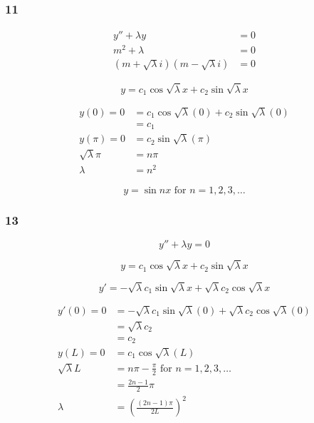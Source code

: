 \documentclass{article}
\begin{document}
\subsubsection{11}

\begin{align*}
  y'' + \lambda y                               & = 0 \\
  m^2 + \lambda                                 & = 0 \\
  (m + \sqrt{\lambda} i) (m - \sqrt{\lambda} i) & = 0
\end{align*}

\[y = c_1 \cos \sqrt{\lambda} x + c_2 \sin \sqrt{\lambda} x\]

\begin{align*}
  y(0) = 0           & = c_1 \cos \sqrt \lambda (0) + c_2 \sin \sqrt \lambda (0) \\
                     & = c_1                                                     \\
  y(\pi) = 0         & = c_2 \sin \sqrt \lambda (\pi)                            \\
  \sqrt{\lambda} \pi & = n \pi                                                   \\
  \lambda            & = n^2
\end{align*}

\[y = \sin n x \text{ for } n = 1, 2, 3, \ldots\]

\subsubsection{13}

\[y'' + \lambda y = 0 \]

\[y = c_1 \cos \sqrt \lambda x + c_2 \sin \sqrt \lambda x\]

\[y' = -\sqrt \lambda c_1 \sin \sqrt \lambda x + \sqrt \lambda c_2 \cos \sqrt \lambda x\]

\begin{align*}
  y'(0) = 0       & = -\sqrt \lambda c_1 \sin \sqrt \lambda (0) + \sqrt \lambda c_2 \cos \sqrt \lambda (0) \\
                  & = \sqrt \lambda c_2                                                                    \\
                  & = c_2                                                                                  \\
  y(L) = 0        & = c_1 \cos \sqrt \lambda (L)                                                           \\
  \sqrt \lambda L & = n \pi - \frac{\pi}{2} \text{ for } n = 1, 2, 3, \ldots                               \\
                  & = \frac{2 n - 1}{2} \pi                                                                \\
  \lambda         & = \left( \frac{(2n - 1) \pi}{2 L} \right)^2
\end{align*}
\end{document}
